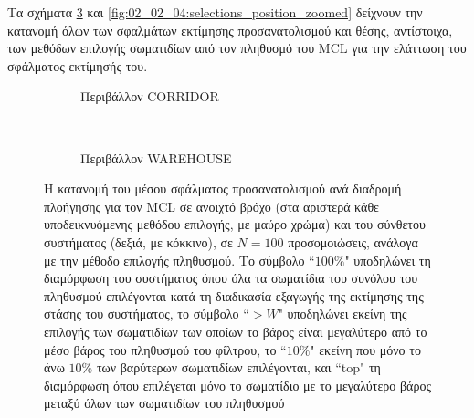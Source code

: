 Τα σχήματα \ref{fig:02_02_04:selections_orientation_zoomed} και
\ref{fig:02_02_04:selections_position_zoomed} δείχνουν την κατανομή όλων των
σφαλμάτων εκτίμησης προσανατολισμού και θέσης, αντίστοιχα, των μεθόδων επιλογής
σωματιδίων από τον πληθυσμό του MCL για την ελάττωση του σφάλματος εκτίμησής
του.

\begin{figure}
  \vspace{2cm}
  \begin{subfigure}{\linewidth}
  \hspace{-1.25cm}
    
    \vspace{0.3cm}
    \caption{Περιβάλλον CORRIDOR}
    \label{}
  \end{subfigure}\\
  \begin{subfigure}{\linewidth}\vspace{0.5cm}
    \hspace{-1.25cm}
    
    \vspace{0.3cm}
    \caption{Περιβάλλον WAREHOUSE}
    \label{}
    \end{subfigure}
\caption{\small Η κατανομή του μέσου σφάλματος προσανατολισμού ανά διαδρομή
         πλοήγησης για τον MCL σε ανοιχτό βρόχο (στα αριστερά κάθε
         υποδεικνυόμενης μεθόδου επιλογής, με μαύρο χρώμα) και του σύνθετου
         συστήματος (δεξιά, με κόκκινο), σε $N=100$ προσομοιώσεις, ανάλογα με
         την μέθοδο επιλογής πληθυσμού. Το σύμβολο ``$100\%$" υποδηλώνει τη
         διαμόρφωση του συστήματος όπου όλα τα σωματίδια του συνόλου του
         πληθυσμού επιλέγονται κατά τη διαδικασία εξαγωγής της εκτίμησης της
         στάσης του συστήματος, το σύμβολο ``$>\overline{W}$" υποδηλώνει εκείνη
         της επιλογής των σωματιδίων των οποίων το βάρος είναι μεγαλύτερο από
         το μέσο βάρος του πληθυσμού του φίλτρου, το ``$10\%$" εκείνη που μόνο
         το άνω $10\%$ των βαρύτερων σωματιδίων επιλέγονται, και ``top" τη
         διαμόρφωση όπου επιλέγεται μόνο το σωματίδιο με το μεγαλύτερο βάρος
         μεταξύ όλων των σωματιδίων του πληθυσμού}
\label{fig:02_02_04:selections_orientation_zoomed}
\end{figure}



